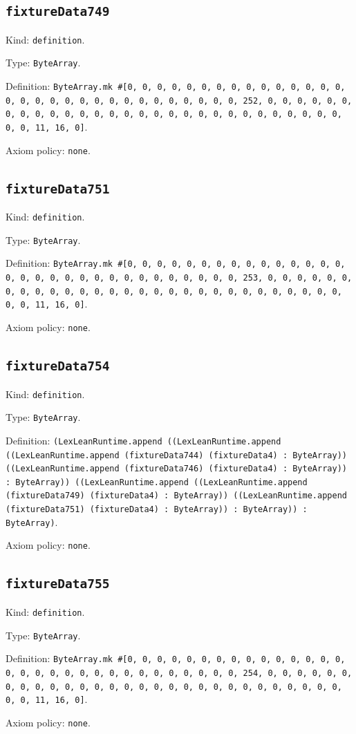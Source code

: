 \documentclass[11pt]{article}
\begin{document}
\subsection*{\texttt{fixtureData749}}
\noindent Kind: \texttt{definition}.\par
\noindent Type: \texttt{ByteArray}.\par
\noindent Definition: \texttt{ByteArray.mk \#[0, 0, 0, 0, 0, 0, 0, 0, 0, 0, 0, 0, 0, 0, 0, 0, 0, 0, 0, 0, 0, 0, 0, 0, 0, 0, 0, 0, 0, 0, 0, 252, 0, 0, 0, 0, 0, 0, 0, 0, 0, 0, 0, 0, 0, 0, 0, 0, 0, 0, 0, 0, 0, 0, 0, 0, 0, 0, 0, 0, 0, 0, 0, 11, 16, 0]}.\par
\noindent Axiom policy: \texttt{none}.\par
\subsection*{\texttt{fixtureData751}}
\noindent Kind: \texttt{definition}.\par
\noindent Type: \texttt{ByteArray}.\par
\noindent Definition: \texttt{ByteArray.mk \#[0, 0, 0, 0, 0, 0, 0, 0, 0, 0, 0, 0, 0, 0, 0, 0, 0, 0, 0, 0, 0, 0, 0, 0, 0, 0, 0, 0, 0, 0, 0, 253, 0, 0, 0, 0, 0, 0, 0, 0, 0, 0, 0, 0, 0, 0, 0, 0, 0, 0, 0, 0, 0, 0, 0, 0, 0, 0, 0, 0, 0, 0, 0, 11, 16, 0]}.\par
\noindent Axiom policy: \texttt{none}.\par
\subsection*{\texttt{fixtureData754}}
\noindent Kind: \texttt{definition}.\par
\noindent Type: \texttt{ByteArray}.\par
\noindent Definition: \texttt{(LexLeanRuntime.append ((LexLeanRuntime.append ((LexLeanRuntime.append (fixtureData744) (fixtureData4) : ByteArray)) ((LexLeanRuntime.append (fixtureData746) (fixtureData4) : ByteArray)) : ByteArray)) ((LexLeanRuntime.append ((LexLeanRuntime.append (fixtureData749) (fixtureData4) : ByteArray)) ((LexLeanRuntime.append (fixtureData751) (fixtureData4) : ByteArray)) : ByteArray)) : ByteArray)}.\par
\noindent Axiom policy: \texttt{none}.\par
\subsection*{\texttt{fixtureData755}}
\noindent Kind: \texttt{definition}.\par
\noindent Type: \texttt{ByteArray}.\par
\noindent Definition: \texttt{ByteArray.mk \#[0, 0, 0, 0, 0, 0, 0, 0, 0, 0, 0, 0, 0, 0, 0, 0, 0, 0, 0, 0, 0, 0, 0, 0, 0, 0, 0, 0, 0, 0, 0, 254, 0, 0, 0, 0, 0, 0, 0, 0, 0, 0, 0, 0, 0, 0, 0, 0, 0, 0, 0, 0, 0, 0, 0, 0, 0, 0, 0, 0, 0, 0, 0, 11, 16, 0]}.\par
\noindent Axiom policy: \texttt{none}.\par
\end{document}
